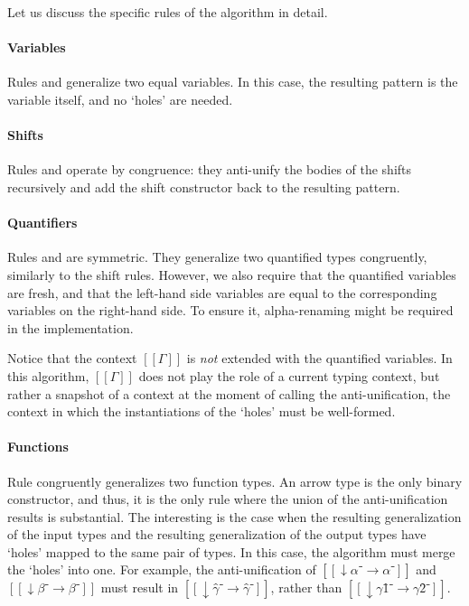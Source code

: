 Let us discuss the specific rules of the algorithm in detail.

\paragraph{Variables} 
  Rules  and
   generalize two equal variables.
  In this case, the resulting pattern is the variable itself,
  and no `holes' are needed.

\paragraph{Shifts} 
  Rules  and
   operate by congruence:
  they anti-unify the bodies of the shifts recursively and add
  the shift constructor back to the resulting pattern.

\paragraph{Quantifiers}
  Rules  and
   are symmetric. 
  They generalize two quantified types congruently, 
  similarly to the shift rules. 
  However, we also require that the quantified variables
  are fresh, and that the left-hand side variables are 
  equal to the corresponding variables on the right-hand side.
  To ensure it, alpha-renaming might be required in the
  implementation.

  Notice that the context $[[Γ]]$ is \emph{not} extended with 
  the quantified variables. In this algorithm, $[[Γ]]$ 
  does not play the role of a current typing context, but rather
  a snapshot of a context at the moment of calling the anti-unification,
  \ie the context in which the instantiations of the `holes' 
  must be well-formed.

\paragraph{Functions}
  Rule  congruently generalizes two function types. 
  An arrow type is the only binary constructor, 
  and thus, it is the only rule where the union of the anti-unification results is substantial.
  The interesting is the case when the resulting generalization of the 
  input types and the resulting generalization of the output types 
  have `holes' mapped to the same pair of types. 
  In this case, the algorithm must merge the `holes' into one.
  For example, the anti-unification of 
  $[[↓α⁻ → α⁻]]$ and $[[↓β⁻ → β⁻]]$
  must result in $[[↓γ̂⁻ → γ̂⁻]]$,
  rather than $[[↓γ1̂⁻ → γ2̂⁻]]$.

